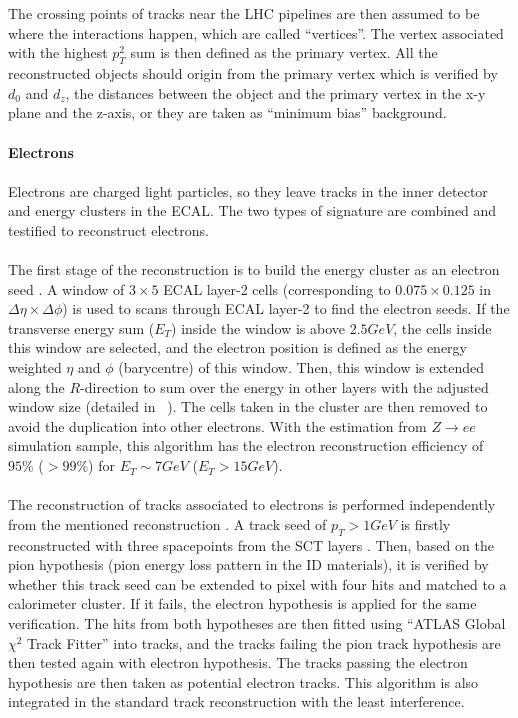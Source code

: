 \\
\\The crossing points of tracks near the LHC pipelines are then assumed to be where the interactions happen, which are called ``vertices''. The vertex associated with the highest $p_{T}^2$ sum is then defined as the primary vertex. All the reconstructed objects should origin from the primary vertex which is verified by $d_{0}$ and $d_z$, the distances between the object and the primary vertex in the x-y plane and the z-axis, or they are taken as ``minimum bias'' background.  
\\
\\{\bf Electrons}
\\
\\Electrons are charged light particles, so they leave tracks in the inner detector and energy clusters in the ECAL. The two types of signature are combined and testified to reconstruct electrons.
\\
\\The first stage of the reconstruction is to build the energy cluster as an electron seed \cite{ATLAS-CONF-2016-024,ATL-LARG-PUB-2008-002}. A window of $3 \times 5$ ECAL layer-2 cells (corresponding to $0.075 \times 0.125$ in $\Delta \eta \times \Delta \phi$) is used to scans through ECAL layer-2 to find the electron seeds. If the transverse energy sum ($E_{T}$) inside the window is above $2.5GeV$, the cells inside this window are selected, and the electron position is defined as the energy weighted $\eta$ and $\phi$ (barycentre) of this window. Then, this window is extended along the $R$-direction to sum over the energy in other layers with the adjusted window size (detailed in ~\cite{}). The cells taken in the cluster are then removed to avoid the duplication into other electrons. With the estimation from $Z\to ee$ simulation sample, this algorithm has the electron reconstruction efficiency of $95\%$ ($>99\%$) for $E_{T}\sim7GeV$ ($E_{T}>15GeV$).
\\
\\The reconstruction of tracks associated to electrons is performed independently from the mentioned reconstruction . A track seed of $p_{T}>1GeV$ is firstly reconstructed with three spacepoints from the SCT layers . Then, based on the pion hypothesis (pion energy loss pattern in the ID materials), it is verified by whether this track seed can be extended to pixel with four hits and matched to a calorimeter cluster. If it fails, the electron hypothesis is applied for the same verification. The hits from both hypotheses are then fitted using ``ATLAS Global $\chi^{2}$ Track Fitter''\cite{Cornelissen:2008zza} into tracks, and the tracks failing the pion track hypothesis are then tested again with electron hypothesis. The tracks passing the electron hypothesis are then taken as potential electron tracks. This algorithm is also integrated in the standard track reconstruction with the least interference.
